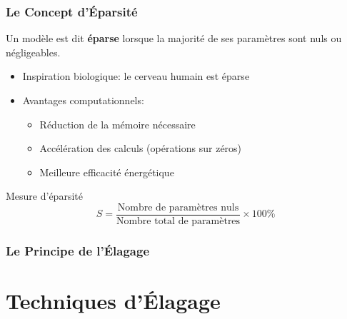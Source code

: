 \documentclass[10pt]{beamer}
\begin{document}
\begin{frame}
\frametitle{Le Concept d'Éparsité}
\begin{definition}
Un modèle est dit \textbf{éparse} lorsque la majorité de ses paramètres sont nuls ou négligeables.
\end{definition}

\begin{itemize}
    \item Inspiration biologique: le cerveau humain est éparse
    \item Avantages computationnels:
    \begin{itemize}
        \item Réduction de la mémoire nécessaire
        \item Accélération des calculs (opérations sur zéros)
        \item Meilleure efficacité énergétique
    \end{itemize}
\end{itemize}

\begin{block}{Mesure d'éparsité}
\[
S = \frac{\text{Nombre de paramètres nuls}}{\text{Nombre total de paramètres}} \times 100\%
\]
\end{block}
\end{frame}

\begin{frame}
\frametitle{Le Principe de l'Élagage}
\begin{center}
\end{center}
\end{frame}

\section{Techniques d'Élagage}
\end{document}
